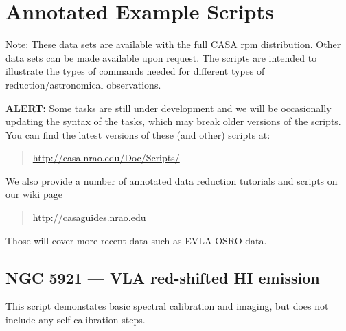 

\chapter[Appendix: Annotated Example Scripts]{Annotated Example Scripts}
\label{chapter:scripts}

Note: These data sets are available with the full
CASA rpm distribution.  Other data sets can be made available upon
request.  The scripts are intended to illustrate the types of
commands needed for different types of reduction/astronomical
observations.

{\bf ALERT:} Some tasks are still under development and we will be
occasionally updating the syntax of the tasks, which may break older
versions of the scripts. You can find the latest versions of these
(and other) scripts at:
\begin{quote}
   \url{http://casa.nrao.edu/Doc/Scripts/}
\end{quote}

We also provide a number of annotated data reduction tutorials and
scripts on our wiki page 

\begin{quote}
\url{http://casaguides.nrao.edu}
\end{quote}

Those will cover more recent data such as EVLA OSRO data.

\section{NGC 5921 --- VLA red-shifted HI emission}
\label{section:scripts.ngc5921}

This script demonstates basic spectral calibration and imaging, but
does not include any self-calibration steps.

